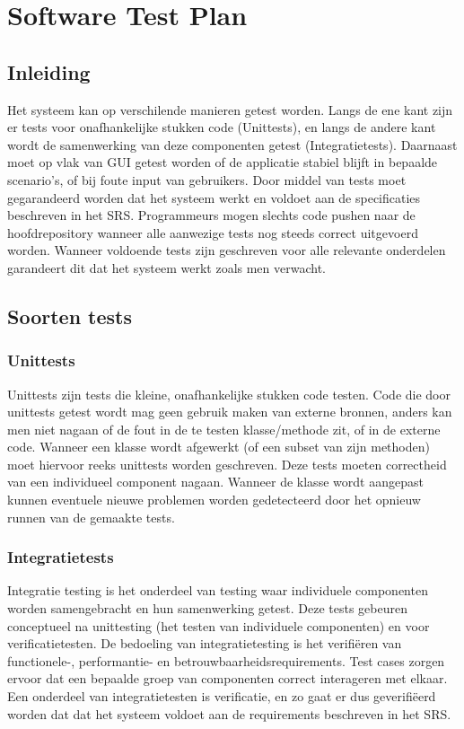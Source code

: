 \chapter{Software Test Plan}
\section{Inleiding}
Het systeem kan op verschilende manieren getest worden. 
Langs de ene kant zijn er tests voor onafhankelijke stukken code (Unittests), en langs de andere kant wordt de samenwerking van deze componenten getest (Integratietests). 
Daarnaast moet op vlak van GUI getest worden of de applicatie stabiel blijft in bepaalde scenario's, of bij foute input van gebruikers. 
Door middel van tests moet gegarandeerd worden dat het systeem werkt en voldoet aan de specificaties beschreven in het SRS\cite{srs}. 
Programmeurs mogen slechts code pushen naar de hoofdrepository wanneer alle aanwezige tests nog steeds correct uitgevoerd worden.
Wanneer voldoende tests zijn geschreven voor alle relevante onderdelen garandeert dit dat het systeem werkt zoals men verwacht.

\section{Soorten tests}

\subsection{Unittests}
Unittests zijn tests die kleine, onafhankelijke stukken code testen. Code die door unittests getest wordt mag geen gebruik maken van externe bronnen, anders kan men niet nagaan of de fout in de te testen klasse/methode zit, of in de externe code.
Wanneer een klasse wordt afgewerkt (of een subset van zijn methoden) moet hiervoor reeks unittests worden geschreven. 
Deze tests moeten correctheid van een individueel component nagaan. 
Wanneer de klasse wordt aangepast kunnen eventuele nieuwe problemen worden gedetecteerd door het opnieuw runnen van de gemaakte tests. 

\subsection{Integratietests}
Integratie testing is het onderdeel van testing waar individuele componenten worden samengebracht en hun samenwerking getest.
Deze tests gebeuren conceptueel na unittesting (het testen van individuele componenten) en voor verificatietesten. 
De bedoeling van integratietesting is het verifi\"{e}ren van functionele-, performantie- en betrouwbaarheidsrequirements. 
Test cases zorgen ervoor dat een bepaalde groep van componenten correct interageren met elkaar.
Een onderdeel van integratietesten is verificatie, en zo gaat er dus geverifi\"{e}erd worden dat dat het systeem voldoet aan de requirements beschreven in het SRS\cite{srs}. 

